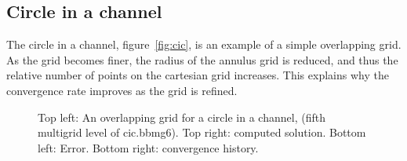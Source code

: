 \documentclass{article}
\begin{document}
\subsection{Circle in a channel}

   The circle in a channel, figure~\ref{fig:cic}, is an example of a simple overlapping grid.
As the grid becomes finer, the radius of the annulus grid is reduced, and thus the relative
number of points on the cartesian grid increases. This explains why the convergence rate
improves as the grid is refined.


{
\newcommand{\figWidth}{7.cm}
\newcommand{\trimfig}[2]{\trimPlotb{#1}{#2}{.0}{.0}{.0}{.0}}
\begin{figure}[hbt]
\begin{center}
\end{center}
\caption{Top left: An overlapping grid for a circle in a channel, (fifth multigrid level of cic.bbmg6). 
Top right: computed solution. Bottom left: Error. Bottom right: convergence history.
} \label{fig:cic-conv}
\end{figure}
}





\end{document}
